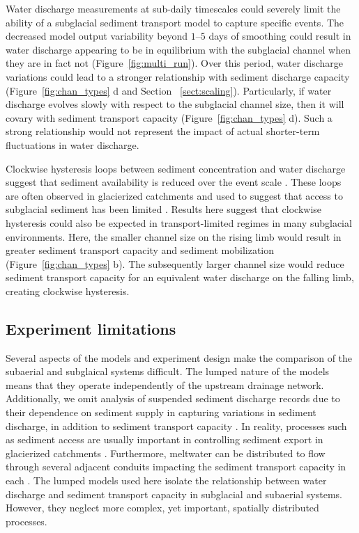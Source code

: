 \documentclass[tc, manuscript]{copernicus}
\begin{document}
Water discharge measurements at sub-daily timescales could severely limit the ability of a subglacial sediment transport model to capture specific events.
The decreased model output variability beyond $1$--$5$ days of smoothing could result in water discharge appearing to be in equilibrium with the subglacial channel when they are in fact not (Figure~\ref{fig:multi_run}).
Over this period, water discharge variations could lead to a stronger relationship with sediment discharge capacity (Figure~\ref{fig:chan_types} d and Section ~\ref{sect:scaling}).
Particularly, if water discharge evolves slowly with respect to the subglacial channel size, then it will covary with sediment transport capacity (Figure~\ref{fig:chan_types} d).
Such a strong relationship would not represent the impact of actual shorter-term fluctuations in water discharge.

Clockwise hysteresis loops between sediment concentration and water discharge suggest that sediment availability is reduced over the event scale \citep[][]{williams1989}.
These loops are often observed in glacierized catchments and used to suggest that access to subglacial sediment has been limited \citep[e.g.][]{collins1979,willis1996,richards2003,stott2007,delaney2018}.
Results here suggest that clockwise hysteresis could also be expected in transport-limited regimes in many subglacial environments.
Here, the smaller channel size on the rising limb would result in greater sediment transport capacity and sediment mobilization (Figure~\ref{fig:chan_types} b).
The subsequently larger channel size would reduce sediment transport capacity for an equivalent water discharge on the falling limb, creating clockwise hysteresis. 

\subsection{Experiment limitations}

Several aspects of the models and experiment design make the comparison of the subaerial and subglaical systems difficult. 
The lumped nature of the models means that they operate independently of the upstream drainage network.
Additionally, we omit analysis of suspended sediment discharge records due to their dependence on sediment supply in capturing variations in sediment discharge, in addition to sediment transport capacity \citep[e.g.][]{delaney2019}.
In reality, processes such as sediment access are usually important in controlling sediment export in glacierized catchments \citep[e.g.][]{herman2015,vergara2022}.
Furthermore, meltwater can be distributed to flow through several adjacent conduits impacting the sediment transport capacity in each \citep[e.g.][]{werder2013,hewitt2019,delaney2023}.
The lumped models used here isolate the relationship between water discharge and sediment transport capacity in subglacial and subaerial systems. 
However, they neglect more complex, yet important, spatially distributed processes.
\end{document}
